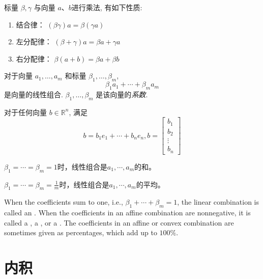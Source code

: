 \begin{theorem}
    标量 \( \beta, \gamma \) 与向量 \( a 、 b \)进行乘法, 有如下性质:
    \begin{enumerate}
        \item 结合律： \( (\beta \gamma) a=\beta(\gamma a) \)
        \item 左分配律： \( (\beta+\gamma) a=\beta a+\gamma a \)
        \item 右分配律： \( \beta(a+b)=\beta a+\beta b \)
    \end{enumerate}
\end{theorem}

\begin{definition}[线性组合]
    对于向量 \( a_{1}, \ldots, a_{m} \) 和标量 \( \beta_{1}, \ldots, \beta_{m} \),
    $$ \beta_{1} a_{1}+\cdots+\beta_{m} a_{m} $$
    是向量的线性组合. \( \beta_{1}, \ldots, \beta_{m} \) 是该向量的\textit{系数}. 
\end{definition}



    \begin{theorem}
        对于任何向量 \( b \in \mathbb{R}^{n} \), 满足
    $$ b=b_{1} e_{1}+\cdots+b_{n} e_{n}, b=\left[\begin{array}{c}b_{1} \\ b_{2} \\ \vdots \\ b_{n}\end{array}\right] $$
    \end{theorem}
    
    $ \beta_{1}=\cdots=\beta_{m}=1 $时，线性组合是$a_1, \cdots, a_m$的和。

    $ \beta_{1}=\cdots=\beta_{m} = \frac{1}{m} $时，线性组合是$a_1, \cdots, a_m$的平均。

    When the coefficients sum to one, i.e., $ \beta_{1}+\cdots+\beta_{m}=1 $, the linear combination is called an . When the coefficients in an affine combination are nonnegative, it is called a , a , or a . The coefficients in an affine or convex combination are sometimes given as percentages, which add up to $ 100 \% $.

\section{内积}

